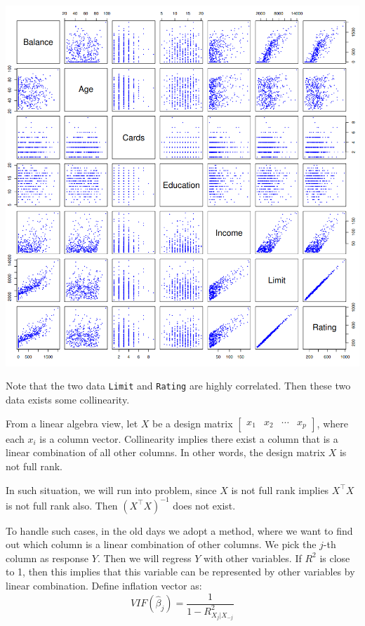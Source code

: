 \documentclass{article}
\theoremstyle{MyNonumberplain}
\theoremstyle{break}
\newcommand{\T}{^\intercal}
\newcommand{\inv}{^{-1}}
\theoremstyle{break}
\theoremstyle{break}
\theoremstyle{break}
\begin{document}
\begin{center}
    \includegraphics*[scale=0.25]{Images/img13.png}
\end{center}

Note that the two data \texttt{Limit} and \texttt{Rating} are highly correlated. Then these two data exists some collinearity.

From a linear algebra view, let $X$ be a design matrix 
$\begin{bmatrix}
    x_1 & x_2 & \cdots & x_p
\end{bmatrix}$, where each $x_i$ is a column vector. 
Collinearity implies there exist a column that is a linear combination of all other columns.
In other words, the design matrix $X$ is not full rank.

In such situation, we will run into problem, since $X$ is not full rank implies $X\T X$ is not full rank also.
Then $(X\T X)\inv$ does not exist. 

To handle such cases, in the old days we adopt a method, where we want to find out which column is
a linear combination of other columns. We pick the $j$-th column as response $Y$. Then we will regress $Y$ with
other variables. If $R^2$ is close to 1, then this implies that this variable can be represented by other variables 
by linear combination. Define inflation vector as:
$$
VIF(\hat\beta_j)=\frac{1}{1-R^2_{X_j|X_{-j}}}
$$
\end{document}
